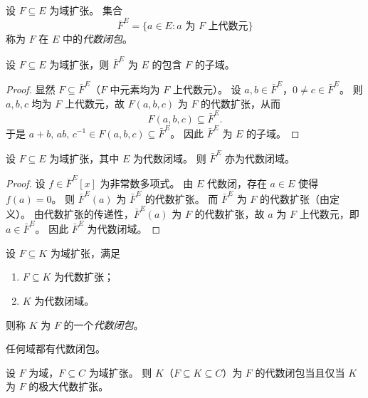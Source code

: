 \documentclass[lang=cn,a4paper,newtx]{elegantbook}
\begin{document}
\begin{definition}[代数闭包]
  设 $F\subseteq E$ 为域扩张。
  集合
  \[
    \bar{F}^E=\{a\in E: a\text{ 为 }F\text{ 上代数元}\}
  \]
  称为 $F$ 在 $E$ 中的\emph{代数闭包}。
\end{definition}

\begin{proposition}
  设 $F\subseteq E$ 为域扩张，则 $\bar{F}^E$ 为 $E$ 的包含 $F$ 的子域。
\end{proposition}

\begin{proof}
  显然 $F\subseteq\bar{F}^E$（$F$ 中元素均为 $F$ 上代数元）。
  设 $a,b\in\bar{F}^E$，$0\ne c\in\bar{F}^E$。
  则 $a,b,c$ 均为 $F$ 上代数元，故 $F(a,b,c)$ 为 $F$ 的代数扩张，从而
  \[
    F(a,b,c)\subseteq\bar{F}^E.
  \]
  于是 $a+b,\,ab,\,c^{-1}\in F(a,b,c)\subseteq\bar{F}^E$。
  因此 $\bar{F}^E$ 为 $E$ 的子域。
\end{proof}

\begin{proposition}
  设 $F\subseteq E$ 为域扩张，其中 $E$ 为代数闭域。
  则 $\bar{F}^E$ 亦为代数闭域。
\end{proposition}

\begin{proof}
  设 $f\in\bar{F}^E[x]$ 为非常数多项式。
  由 $E$ 代数闭，存在 $a\in E$ 使得 $f(a)=0$。
  则 $\bar{F}^E(a)$ 为 $\bar{F}^E$ 的代数扩张。
  而 $\bar{F}^E$ 为 $F$ 的代数扩张（由定义）。
  由代数扩张的传递性，$\bar{F}^E(a)$ 为 $F$ 的代数扩张，故 $a$ 为 $F$ 上代数元，即 $a\in\bar{F}^E$。
  因此 $\bar{F}^E$ 为代数闭域。
\end{proof}

\begin{definition}[代数闭包]
  设 $F\subseteq K$ 为域扩张，满足
  \begin{enumerate}
    \item $F\subseteq K$ 为代数扩张；
    \item $K$ 为代数闭域。
  \end{enumerate}
  则称 $K$ 为 $F$ 的一个\emph{代数闭包}。
\end{definition}

\begin{theorem}
  任何域都有代数闭包。
\end{theorem}

\begin{lemma}\label{alg-closure-iff-maximal}
  设 $F$ 为域，$F\subseteq C$ 为域扩张。
  则 $K$（$F\subseteq K\subseteq C$）为 $F$ 的代数闭包当且仅当 $K$ 为 $F$ 的极大代数扩张。
\end{lemma}
\end{document}
